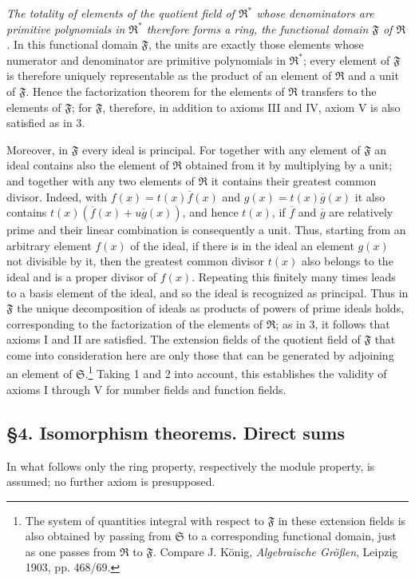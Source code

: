 \documentclass[11pt]{article}
\providecommand{\mR}{\mathfrak{R}}
\providecommand{\mS}{\mathfrak{S}}
\providecommand{\mF}{\mathfrak{F}}
\begin{document}
\emph{The totality of elements of the quotient field of $\mR^*$ whose denominators are primitive polynomials in $\mR^*$ therefore forms a ring, the functional domain $\mF$ of $\mR$.} In this functional domain $\mF$, the units are exactly those elements whose numerator and denominator are primitive polynomials in $\mR^*$; every element of $\mF$ is therefore uniquely representable as the product of an element of $\mR$ and a unit of $\mF$. Hence the factorization theorem for the elements of $\mR$ transfers to the elements of $\mF$; for $\mF$, therefore, in addition to axioms III and IV, axiom V is also satisfied as in 3.

Moreover, in $\mF$ every ideal is principal. For together with any element of $\mF$ an ideal contains also the element of $\mR$ obtained from it by multiplying by a unit; and together with any two elements of $\mR$ it contains their greatest common divisor. Indeed, with $f(x)=t(x)\overline f(x)$ and $g(x)=t(x)\overline g(x)$ it also contains $t(x)(\overline f(x)+u\overline g(x))$, and hence $t(x)$, if $\overline f$ and $\overline g$ are relatively prime and their linear combination is consequently a unit. Thus, starting from an arbitrary element $f(x)$ of the ideal, if there is in the ideal an element $g(x)$ not divisible by it, then the greatest common divisor $t(x)$ also belongs to the ideal and is a proper divisor of $f(x)$. Repeating this finitely many times leads to a basis element of the ideal, and so the ideal is recognized as principal. Thus in $\mF$ the unique decomposition of ideals as products of powers of prime ideals holds, corresponding to the factorization of the elements of $\mR$; as in 3, it follows that axioms I and II are satisfied. The extension fields of the quotient field of $\mF$ that come into consideration here are only those that can be generated by adjoining an element of $\mS$.\footnote{The system of quantities integral with respect to $\mF$ in these extension fields is also obtained by passing from $\mS$ to a corresponding functional domain, just as one passes from $\mR$ to $\mF$. Compare J. König, \emph{Algebraische Größen}, Leipzig 1903, pp. 468/69.} Taking 1 and 2 into account, this establishes the validity of axioms I through V for number fields and function fields.

\subsection*{§4. Isomorphism theorems. Direct sums}

In what follows only the ring property, respectively the module property, is assumed; no further axiom is presupposed.
\end{document}
